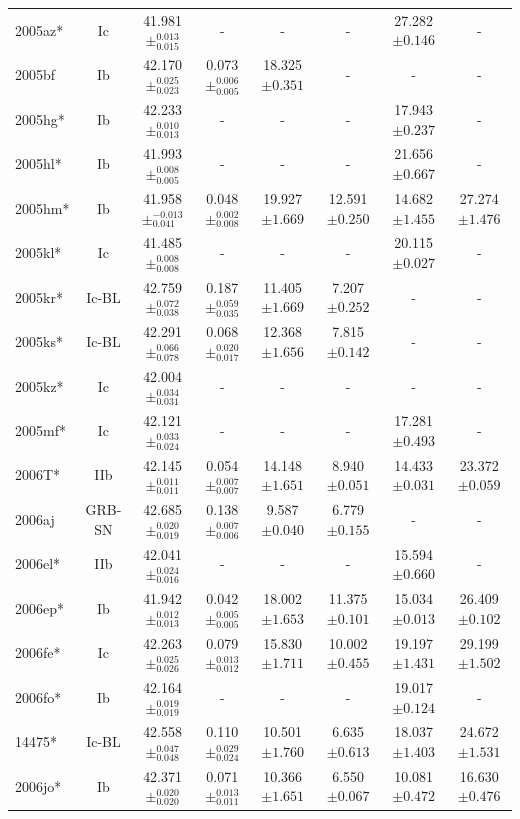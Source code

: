 \documentclass[a4paper,fleqn,usenatbib]{mnras}
\begin{document}
\begin{table}
\begin{minipage}{160mm}
\begin{tabular}{lccccccc}
2005az* & Ic & 41.981$\pm^{0.013}_{0.015}$ & - & - & - & 27.282$\pm 0.146$ & -\\
2005bf & Ib & 42.170$\pm^{0.025}_{0.023}$ & 0.073$\pm^{0.006}_{0.005}$ & 18.325$\pm{0.351}$ & - & - & -\\
2005hg* & Ib & 42.233$\pm^{0.010}_{0.013}$ & - & - & - & 17.943$\pm 0.237$ & -\\
2005hl* & Ib & 41.993$\pm^{0.008}_{0.005}$ & - & - & - & 21.656$\pm 0.667$ & -\\
2005hm* & Ib & 41.958$\pm^{-0.013}_{0.041}$ & 0.048$\pm^{0.002}_{0.008}$ & 19.927$\pm{1.669}$ & 12.591$\pm 0.250$ & 14.682$\pm 1.455$ & 27.274$\pm 1.476$\\
2005kl* & Ic & 41.485$\pm^{0.008}_{0.008}$ & - & - & - & 20.115$\pm 0.027$ & -\\
2005kr* & Ic-BL & 42.759$\pm^{0.072}_{0.038}$ & 0.187$\pm^{0.059}_{0.035}$ & 11.405$\pm{1.669}$ & 7.207$\pm 0.252$ & - & -\\
2005ks* & Ic-BL & 42.291$\pm^{0.066}_{0.078}$ & 0.068$\pm^{0.020}_{0.017}$ & 12.368$\pm{1.656}$ & 7.815$\pm 0.142$ & - & -\\
2005kz* & Ic & 42.004$\pm^{0.034}_{0.031}$ & - & - & - & - & -\\
2005mf* & Ic & 42.121$\pm^{0.033}_{0.024}$ & - & - & - & 17.281$\pm 0.493$ & -\\
2006T* & IIb & 42.145$\pm^{0.011}_{0.011}$ & 0.054$\pm^{0.007}_{0.007}$ & 14.148$\pm{1.651}$ & 8.940$\pm 0.051$ & 14.433$\pm 0.031$ & 23.372$\pm 0.059$\\
2006aj & GRB-SN & 42.685$\pm^{0.020}_{0.019}$ & 0.138$\pm^{0.007}_{0.006}$ & 9.587$\pm{0.040}$ & 6.779$\pm 0.155$ & - & -\\
2006el* & IIb & 42.041$\pm^{0.024}_{0.016}$ & - & - & - & 15.594$\pm 0.660$ & -\\
2006ep* & Ib & 41.942$\pm^{0.012}_{0.013}$ & 0.042$\pm^{0.005}_{0.005}$ & 18.002$\pm{1.653}$ & 11.375$\pm 0.101$ & 15.034$\pm 0.013$ & 26.409$\pm 0.102$\\
2006fe* & Ic & 42.263$\pm^{0.025}_{0.026}$ & 0.079$\pm^{0.013}_{0.012}$ & 15.830$\pm{1.711}$ & 10.002$\pm 0.455$ & 19.197$\pm 1.431$ & 29.199$\pm 1.502$\\
2006fo* & Ib & 42.164$\pm^{0.019}_{0.019}$ & - & - & - & 19.017$\pm 0.124$ & -\\
14475* & Ic-BL & 42.558$\pm^{0.047}_{0.048}$ & 0.110$\pm^{0.029}_{0.024}$ & 10.501$\pm{1.760}$ & 6.635$\pm 0.613$ & 18.037$\pm 1.403$ & 24.672$\pm 1.531$\\
2006jo* & Ib & 42.371$\pm^{0.020}_{0.020}$ & 0.071$\pm^{0.013}_{0.011}$ & 10.366$\pm{1.651}$ & 6.550$\pm 0.067$ & 10.081$\pm 0.472$ & 16.630$\pm 0.476$\\

\end{tabular}
\end{minipage}
\end{table}
\end{document}
